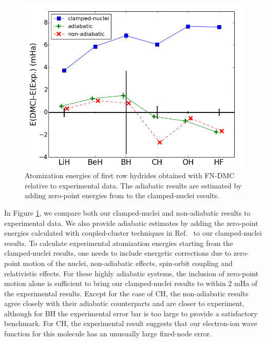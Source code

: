 \documentclass[pra,superscriptaddress,groupedaddress,twocolumn]{revtex4}
\begin{document}
\begin{figure}[h]
\centering
\includegraphics[scale=.4]{Figures/atomization}
\caption{Atomization energies of first row hydrides obtained with FN-DMC relative to experimental data. The adiabatic results are estimated by adding zero-point energies from \cite{Feller_Corrections} to the clamped-nuclei results. \label{fig:atomization}}
\end{figure}

In Figure \ref{fig:atomization}, we compare both our clamped-nuclei and non-adiabatic results to experimental data. We also provide adiabatic estimates by adding the zero-point energies calculated with coupled-cluster techniques in Ref.~\cite{Feller_Corrections} to our clamped-nuclei results. To calculate experimental atomization energies starting from the clamped-nuclei results, one needs to include energetic corrections due to zero-point motion of the nuclei, non-adiabatic effects, spin-orbit coupling and relativistic effects. For these highly adiabatic systems, the inclusion of zero-point motion alone is sufficient to bring our clamped-nuclei results to within 2 mHa of the experimental results. Except for the case of CH, the non-adiabatic results agree closely with their adiabatic counterparts and are closer to experiment, although for BH the experimental error bar is too large to provide a satisfactory benchmark. For CH, the experimental result suggests that our electron-ion wave function for this molecule has an unusually large fixed-node error.
\end{document}
